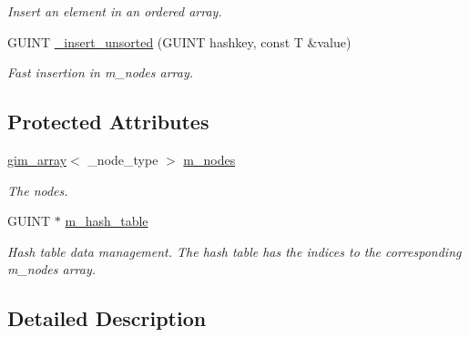 \begin{CompactItemize}
\begin{CompactList}\small\item\em Insert an element in an ordered array. \item\end{CompactList}\item 
\hypertarget{classgim__hash__table_95f93f63d75663f494388dc03423332f}{
GUINT \hyperlink{classgim__hash__table_95f93f63d75663f494388dc03423332f}{\_\-insert\_\-unsorted} (GUINT hashkey, const T \&value)}
\label{classgim__hash__table_95f93f63d75663f494388dc03423332f}

\begin{CompactList}\small\item\em Fast insertion in m\_\-nodes array. \item\end{CompactList}\end{CompactItemize}
\subsection*{Protected Attributes}
\begin{CompactItemize}
\item 
\hypertarget{classgim__hash__table_da83cac38bcf3fd282287f463def04e4}{
\hyperlink{classgim__array}{gim\_\-array}$<$ \_\-node\_\-type $>$ \hyperlink{classgim__hash__table_da83cac38bcf3fd282287f463def04e4}{m\_\-nodes}}
\label{classgim__hash__table_da83cac38bcf3fd282287f463def04e4}

\begin{CompactList}\small\item\em The nodes. \item\end{CompactList}\item 
\hypertarget{classgim__hash__table_35f6b0d640222067b9c76e61887e0354}{
GUINT $\ast$ \hyperlink{classgim__hash__table_35f6b0d640222067b9c76e61887e0354}{m\_\-hash\_\-table}}
\label{classgim__hash__table_35f6b0d640222067b9c76e61887e0354}

\begin{CompactList}\small\item\em Hash table data management. The hash table has the indices to the corresponding m\_\-nodes array. \item\end{CompactList}\end{CompactItemize}


\subsection{Detailed Description}
